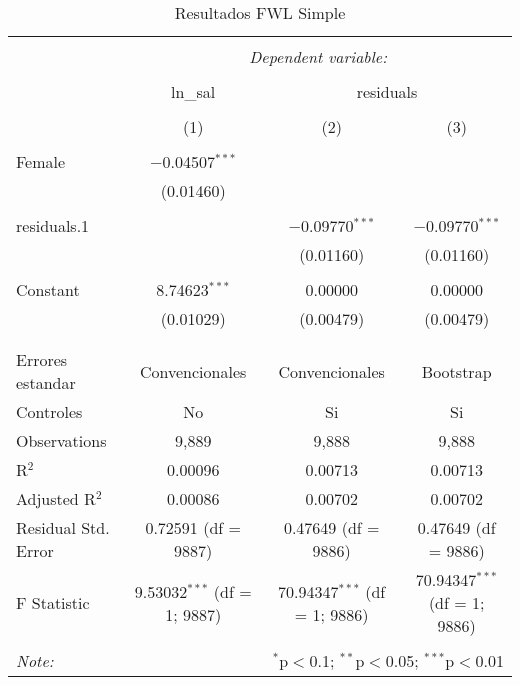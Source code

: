 
\begin{table}[!htbp] \centering 
  \caption{Resultados FWL Simple} 
  \label{} 
\begin{tabular}{@{\extracolsep{5pt}}lccc} 
\\[-1.8ex]\hline 
\hline \\[-1.8ex] 
 & \multicolumn{3}{c}{\textit{Dependent variable:}} \\ 
\cline{2-4} 
\\[-1.8ex] & ln\_sal & \multicolumn{2}{c}{residuals} \\ 
\\[-1.8ex] & (1) & (2) & (3)\\ 
\hline \\[-1.8ex] 
 Female & $-$0.04507$^{***}$ &  &  \\ 
  & (0.01460) &  &  \\ 
  & & & \\ 
 residuals.1 &  & $-$0.09770$^{***}$ & $-$0.09770$^{***}$ \\ 
  &  & (0.01160) & (0.01160) \\ 
  & & & \\ 
 Constant & 8.74623$^{***}$ & 0.00000 & 0.00000 \\ 
  & (0.01029) & (0.00479) & (0.00479) \\ 
  & & & \\ 
\hline \\[-1.8ex] 
Errores estandar & Convencionales & Convencionales & Bootstrap \\ 
Controles & No & Si & Si \\ 
Observations & 9,889 & 9,888 & 9,888 \\ 
R$^{2}$ & 0.00096 & 0.00713 & 0.00713 \\ 
Adjusted R$^{2}$ & 0.00086 & 0.00702 & 0.00702 \\ 
Residual Std. Error & 0.72591 (df = 9887) & 0.47649 (df = 9886) & 0.47649 (df = 9886) \\ 
F Statistic & 9.53032$^{***}$ (df = 1; 9887) & 70.94347$^{***}$ (df = 1; 9886) & 70.94347$^{***}$ (df = 1; 9886) \\ 
\hline 
\hline \\[-1.8ex] 
\textit{Note:}  & \multicolumn{3}{r}{$^{*}$p$<$0.1; $^{**}$p$<$0.05; $^{***}$p$<$0.01} \\ 
\end{tabular} 
\end{table} 
